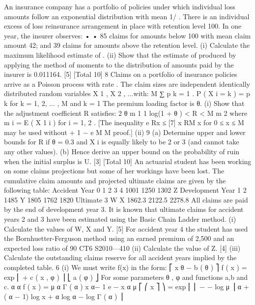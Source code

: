 \documentclass[a4paper,12pt]{article}
\begin{document}
An insurance company has a portfolio of policies under which individual loss amounts follow an exponential distribution with mean 1/ \lambda  . There is an individual excess of loss reinsurance arrangement in place with retention level 100. In one year,
the insurer observes:
•
•
85 claims for amounts below 100 with mean claim amount 42; and
39 claims for amounts above the retention level.
(i) Calculate the maximum likelihood estimate of \lambda  .
(ii) Show that the estimate of \lambda  produced by applying the method of moments to
the distribution of amounts paid by the insurer is 0.011164.
[5]
[Total 10]
8
Claims on a portfolio of insurance policies arrive as a Poisson process with rate \lambda  .
The claim sizes are independent identically distributed random variables
X 1 , X 2 , ...with:
M
∑ p k = 1 .
P ( X i = k ) = p k for k = 1, 2, ... , M and
k = 1
The premium loading factor is θ.
(i)
Show that the adjustment coefficient R satisfies:
2 θ m 1
1
log(1 + θ ) < R <
M
m 2
where m i = E ( X 1 i ) for i = 1, 2 .
[The inequality e Rx ≤
[7]
x RM
x
for 0 ≤ x ≤ M may be used without
+ 1 −
e
M
M
proof.]
(ii)
9
(a) Determine upper and lower bounds for R if θ = 0.3 and X i is equally likely to be 2 or 3 (and cannot take any other values).
(b) Hence derive an upper bound on the probability of ruin when the initial
surplus is U.
[3]
[Total 10]
An actuarial student has been working on some claims projections but some of her workings have been lost. The cumulative claim amounts and projected ultimate
claims are given by the following table:
Accident
Year 0
1
2
3
4 1001
1250
1302
Z
Development Year
1
2
1485
Y
1805
1762
1820
Ultimate
3
W
X
1862.3
2122.5
2278.8
All claims are paid by the end of development year 3.
It is known that ultimate claims for accident years 2 and 3 have been estimated using the Basic Chain Ladder method.
(i)
Calculate the values of W, X and Y.
[5]
For accident year 4 the student has used the Bornhuetter-Ferguson method using an earned premium of 2,500 and an expected loss ratio of 90%
CT6 S2010—410
(ii) Calculate the value of Z.
[4]
(iii) Calculate the outstanding claims reserve for all accident years implied by the completed table.
6
(i)
We must write f(x) in the form:
⎡ x θ − b ( θ )
⎤
f ( x ) = exp ⎢
+ c ( x , φ ) ⎥
⎣ a ( φ )
⎦
For some parameters θ , φ and functions a,b and c.
α α
f ( x ) =
μ α Γ ( α )
x
α− 1
e
−
x α
μ
⎡ ⎛ x
⎤
⎞
= exp ⎢ ⎜ − − log μ ⎟ α + ( α − 1) log x + α log α − log Γ ( α ) ⎥
\end{document}
